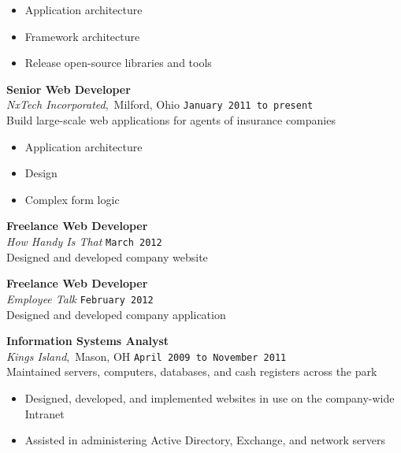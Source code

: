 \documentclass[11pt, line]{res}
\begin{document}
\begin{resume}
				\begin{itemize}
					\item Application architecture
					\item Framework architecture
					\item Release open-source libraries and tools
				\end{itemize}

			\vspace{-4pt}
				\textbf{Senior Web Developer} \\
				\textit{NxTech Incorporated},\, Milford, Ohio
					\hfill \texttt{January 2011 to present} \\
				Build large-scale web applications for agents of insurance companies

				\begin{itemize}
					\item Application architecture
					\item Design
					\item Complex form logic
				\end{itemize}

			\vspace{-4pt}
				\textbf{Freelance Web Developer} \\
				\textit{How Handy Is That}
					\hfill \texttt{March 2012} \\
				Designed and developed company website

			\vspace{-4pt}
				\textbf{Freelance Web Developer} \\
				\textit{Employee Talk}
					\hfill \texttt{February 2012} \\
				Designed and developed company application

			\vspace{-4pt}
				\textbf{Information Systems Analyst} \\
				\textit{Kings Island},\, Mason, OH
					\hfill \texttt{April 2009 to November 2011} \\
				Maintained servers, computers, databases, and cash registers across the park

				\begin{itemize}
					\item Designed, developed, and implemented websites in use on the company-wide Intranet
					\item Assisted in administering Active Directory, Exchange, and network servers
				\end{itemize}
	\end{resume}
\end{document}
